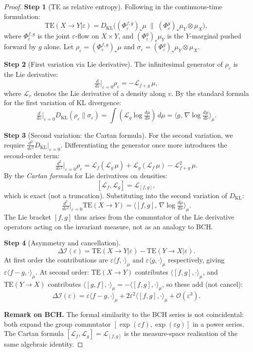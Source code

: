 \documentclass[12pt,a4paper]{article}
\theoremstyle{plain}
\theoremstyle{definition}
\theoremstyle{remark}
\newcommand{\DI}{\Delta\mathcal{I}}
\newcommand{\TE}{\mathrm{TE}}
\begin{document}
\begin{proof}
\textbf{Step 1} (TE as relative entropy).
Following \cite{Schreiber2000} in the continuous-time formulation:
\[
  \TE(X{\to}Y|\varepsilon) = D_{\mathrm{KL}}\!\bigl((\Phi^{f,g}_\varepsilon)_*\mu \;\big\|\; (\Phi^g_\varepsilon)_*\mu_Y \otimes \mu_X\bigr),
\]
where $\Phi^{f,g}_\varepsilon$ is the joint $\varepsilon$-flow on $X\times Y$,
and $(\Phi^g_\varepsilon)_*\mu_Y$ is the $Y$-marginal pushed forward by $g$ alone.
Let $\rho_\varepsilon = (\Phi^{f,g}_\varepsilon)_*\mu$ and $\sigma_\varepsilon = (\Phi^g_\varepsilon)_*\mu_Y\otimes\mu_X$.

\textbf{Step 2} (First variation via Lie derivative).
The infinitesimal generator of $\rho_\varepsilon$ is the Lie derivative:
\[
  \tfrac{d}{d\varepsilon}\big|_{\varepsilon=0} \rho_\varepsilon = -\mathcal{L}_{f+g}\,\mu,
\]
where $\mathcal{L}_v$ denotes the Lie derivative of a density along $v$.
By the standard formula for the first variation of KL divergence:
\[
  \tfrac{d}{d\varepsilon}\big|_{\varepsilon=0} D_{\mathrm{KL}}(\rho_\varepsilon\|\sigma_\varepsilon)
  = \int (\mathcal{L}_g \log \tfrac{d\mu}{d\nu})\,d\mu
  = \langle g,\,\nabla\log\tfrac{d\mu}{d\nu}\rangle_\mu.
\]

\textbf{Step 3} (Second variation: the Cartan formula).
For the second variation, we require $\frac{d^2}{d\varepsilon^2}D_{\mathrm{KL}}|_{\varepsilon=0}$.
Differentiating the generator once more introduces the second-order term:
\[
  \tfrac{d^2}{d\varepsilon^2}\big|_{\varepsilon=0} \rho_\varepsilon
  = \mathcal{L}_f(\mathcal{L}_g\,\mu) + \mathcal{L}_g(\mathcal{L}_f\,\mu) - \mathcal{L}_{f+g}^2\,\mu.
\]
By the \emph{Cartan formula} for Lie derivatives on densities:
\[
  [\mathcal{L}_f, \mathcal{L}_g] = \mathcal{L}_{[f,g]},
\]
which is exact (not a truncation).  Substituting into the second variation of $D_{\mathrm{KL}}$:
\[
  \tfrac{d^2}{d\varepsilon^2}\big|_{\varepsilon=0} \TE(X{\to}Y)
  = \langle [f,g],\,\nabla\log\tfrac{d\mu}{d\nu}\rangle_\mu.
\]
The Lie bracket $[f,g]$ thus arises from the commutator of the Lie derivative operators
acting on the invariant measure, not as an analogy to BCH.

\textbf{Step 4} (Asymmetry and cancellation).
\[
  \DI(\varepsilon) = \TE(X{\to}Y|\varepsilon) - \TE(Y{\to}X|\varepsilon).
\]
At first order the contributions are $\varepsilon\langle f,\cdot\rangle_\mu$ and
$\varepsilon\langle g,\cdot\rangle_\mu$ respectively, giving $\varepsilon\langle f-g,\cdot\rangle_\mu$.
At second order: $\TE(X{\to}Y)$ contributes $\langle[f,g],\cdot\rangle_\mu$, and
$\TE(Y{\to}X)$ contributes $\langle[g,f],\cdot\rangle_\mu = -\langle[f,g],\cdot\rangle_\mu$,
so these add (not cancel):
\[
  \DI(\varepsilon) = \varepsilon\langle f-g,\cdot\rangle_\mu
                   + 2\varepsilon^2\langle[f,g],\cdot\rangle_\mu + \mathcal{O}(\varepsilon^3).
\]

\textbf{Remark on BCH.}  The formal similarity to the BCH series is not coincidental:
both expand the group commutator $[\exp(\varepsilon f),\exp(\varepsilon g)]$ in a power series.
The Cartan formula $[\mathcal{L}_f,\mathcal{L}_g]=\mathcal{L}_{[f,g]}$ is the
measure-space realisation of the same algebraic identity.
\end{proof}
\end{document}
